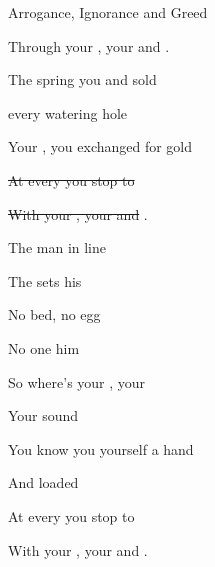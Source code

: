 \begin{SBSong}{Arrogance, Ignorance and Greed}
\begin{SBChorus}
    Through your , your  and . 
  \end{SBChorus}
  \CBPageBrk
  \begin{SBVerse}
    The  spring you  and sold
    
     every watering hole
    
    Your , you exchanged for gold
    
    \sout{ At every  you stop to }

    \sout{With your , your  and }.
  \end{SBVerse}
  \begin{SBVerse}
    The  man  in line
    
    The  sets his 
    
    No  bed, no  egg
    
    No one  him 
    
    So where's your , your 
    
    Your  sound 
    
    You know you  yourself a  hand 
    
    And loaded   
  \end{SBVerse}
  \begin{SBChorus}
     At every  you stop to  

    With your , your  and . 
  \end{SBChorus}
\end{SBSong}

